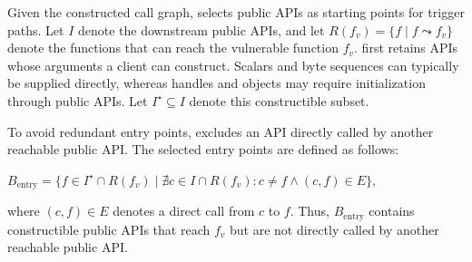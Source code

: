 Given the constructed call graph, \sys selects public APIs as starting points for trigger paths. Let $I$ denote the downstream public APIs,   and let $R(f_v)=\{f \mid f \leadsto f_v\}$ denote the functions that can reach the vulnerable function $f_v$. \sys first retains APIs whose arguments a client can construct. 
Scalars and byte sequences can typically be supplied directly, whereas handles and objects may require initialization through public APIs.  Let $I^\star \subseteq I$ denote this constructible subset.


To avoid redundant entry points, \sys excludes an API directly called by another reachable public API. The selected entry points are defined as follows:
\begin{center}
\small
$B_{\mathrm{entry}} =
\{f \in I^\star \cap R(f_v)
\mid \nexists c \in I \cap R(f_v):
c\neq f \land (c,f)\in E\},$
\end{center}
where $(c,f)\in E$ denotes a direct call from $c$ to $f$.
Thus, $B_{\mathrm{entry}}$ contains constructible public APIs that reach $f_v$ but are not directly called by another reachable public API.

